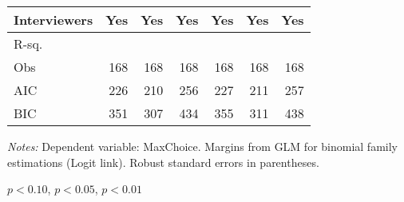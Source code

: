 \begin{table}[htbp]
\begin{adjustbox}{width=1\textwidth}
\begin{threeparttable}
\begin{tabular}{l*{6}{D{.}{.}{-1}}}
Interviewers        &                 Yes   &                 Yes   &                 Yes   &                 Yes   &                 Yes   &                 Yes   \\
\midrule
R-sq.               &                       &                       &                       &                       &                       &                       \\
Obs                 &                 168   &                 168   &                 168   &                 168   &                 168   &                 168   \\
AIC                 &                 226   &                 210   &                 256   &                 227   &                 211   &                 257   \\
BIC                 &                 351   &                 307   &                 434   &                 355   &                 311   &                 438   \\
\bottomrule
\end{tabular}
\begin{tablenotes}
\footnotesize
\item \textit{Notes:} Dependent variable: MaxChoice. Margins from GLM for binomial family estimations (Logit link). Robust standard errors in parentheses.
\item \sym{*} \(p<0.10\), \sym{**} \(p<0.05\), \sym{***} \(p<0.01\)
\end{tablenotes}
\end{threeparttable}
\end{adjustbox}
\label{tab:maxchoice_math}
\end{table}
